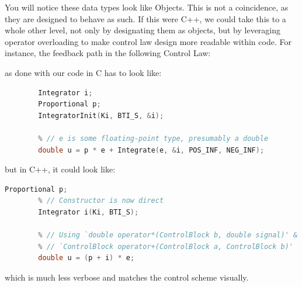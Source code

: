\documentclass[letterpaper]{article}
\begin{document}
\begin{tcolorbox}[colback=yellow!10, colframe=green!20!black!70, title=C-Style Usage]
    You will notice these data types look like Objects. This is not a coincidence, as they are designed to behave as such. If this were C++, we could take this to a whole other level, not only by designating them as objects, but by leveraging operator overloading to make control law design more readable within code. For instance, the feedback path in the following Control Law:

    \begin{figure}[H]
        \centering
    \end{figure}

    as done with our code in C has to look like:

    \begin{lstlisting}[language=C]
        % // Ki and BTI_S is some defined constant
        Integrator i;
        Proportional p;
        IntegratorInit(Ki, BTI_S, &i);

        % // e is some floating-point type, presumably a double
        double u = p * e + Integrate(e, &i, POS_INF, NEG_INF);
    \end{lstlisting}

    but in C++, it could look like:
    \begin{lstlisting}[language=C++]
        Proportional p;
        % // Constructor is now direct
        Integrator i(Ki, BTI_S);

        % // Using `double operator*(ControlBlock b, double signal)' &
        % // `ControlBlock operator+(ControlBlock a, ControlBlock b)'
        double u = (p + i) * e;
    \end{lstlisting}
    which is much less verbose and matches the control scheme visually.

\end{tcolorbox}
\end{document}
